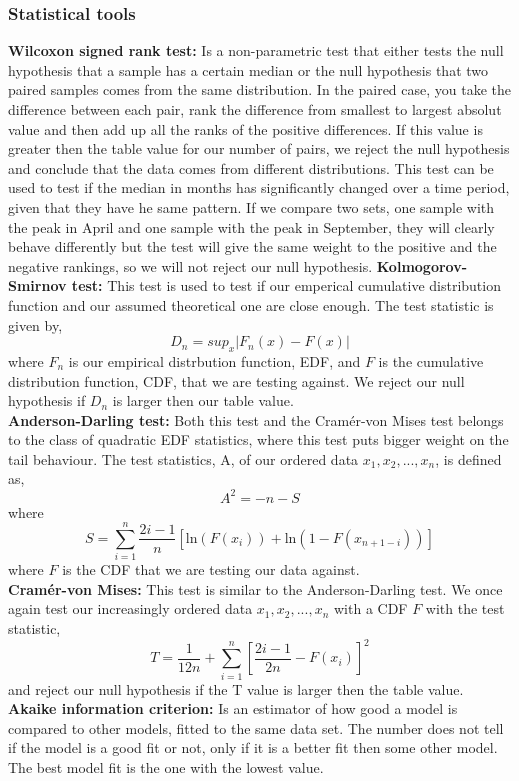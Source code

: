 \documentclass{article}
\begin{document}
	\subsubsection{Statistical tools}
	\textbf{Wilcoxon signed rank test:} Is a non-parametric test that either tests the null hypothesis that a sample has a certain median or the null hypothesis that two paired samples comes from the same distribution. In the paired case, you take the difference between each pair, rank the difference from smallest to largest absolut value and then add up all the ranks of the positive differences. If this value is greater then the table value for our number of pairs, we reject the null hypothesis and conclude that the data comes from different distributions. 
	 This test can be used to test if the median in months has significantly changed over a time period, given that they have he same pattern. If we compare two sets, one sample with the peak in April and one sample with the peak in September, they will clearly behave differently but the test will give the same weight to the positive and the negative rankings, so we will not reject our null hypothesis. \linebreak
	\textbf{Kolmogorov-Smirnov test:} This test is used to test if our emperical cumulative distribution function and our assumed theoretical one are close enough. The test statistic is given by,
	\begin{equation*}
	D_n = sup_x |F_n(x) - F(x)|
	\end{equation*}
	where $F_n$ is our empirical distrbution function, EDF, and $F$ is the cumulative distribution function, CDF, that we are testing against. We reject our null hypothesis if $D_n$ is larger then our table value.\\
	\textbf{Anderson-Darling test:} Both this test and the Cram\'{e}r-von Mises test belongs to the class of quadratic EDF statistics, where this test puts bigger weight on the tail behaviour. The test statistics, A, of our ordered data ${x_1, x_2, ..., x_n}$, is defined as,
	\begin{equation*}
	A^2 = -n - S
	\end{equation*}
	where
	\begin{equation*}
	S = \sum_{i=1}^n\frac{2i -1}{n}[\text{ln}(F(x_i)) + \text{ln}(1 - F(x_{n+1-i}) )]
	\end{equation*}
	where $F$ is the CDF that we are testing our data against. \\
	\textbf{Cram\'{e}r-von Mises:} This test is similar to the Anderson-Darling test. We once again test our increasingly ordered data ${x_1, x_2,...,x_n}$ with a CDF $F$ with the test statistic,
	\begin{equation*}
	T = \frac{1}{12n} + \sum_{i=1}^{n}\left[\frac{2i-1}{2n} - F(x_i)\right]^2
	\end{equation*}
	and reject our null hypothesis if the T value is larger then the table value.\\
	\textbf{Akaike information criterion:} Is an estimator of how good a model is compared to other models, fitted to the same data set. The number does not tell if the model is a good fit or not, only if it is a better fit then some other model. The best model fit is the one with the lowest value. 
\end{document}

